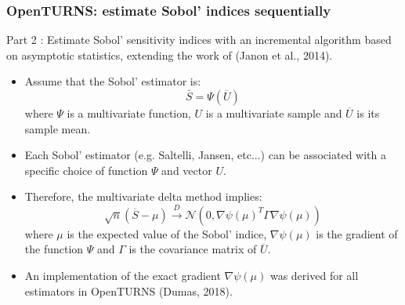 \documentclass{beamer}
\begin{document}

\begin{frame}[containsverbatim]
\frametitle{OpenTURNS: estimate Sobol' indices sequentially}

Part 2 : Estimate Sobol' sensitivity indices with an incremental algorithm 
based on asymptotic statistics, extending the work of (Janon et al., 2014).
\begin{itemize}
\item Assume that the Sobol' estimator is:
$$
\bar{S} = \Psi\left(\overline{U}\right)
$$
where $\Psi$ is a multivariate function, $U$ is a multivariate sample and $\overline{U}$ is its 
sample mean. 

\item Each Sobol' estimator (e.g. Saltelli, Jansen, etc...) 
can be associated with a specific choice of function $\Psi$ and vector $U$. 

\item Therefore, the multivariate delta method implies:
$$
\sqrt{n} \left(\overline{S} - \mu\right) \xrightarrow{D} \mathcal{N}\left(0,\nabla \psi(\mu)^T \Gamma\nabla \psi(\mu)\right)
$$
where $\mu$ is the expected value of the Sobol' indice, $\nabla \psi(\mu)$ is the 
gradient of the function $\Psi$ and $\Gamma$ is the covariance matrix of 
$\overline{U}$. 

\item An implementation of the exact gradient $\nabla \psi(\mu)$ was 
derived for all estimators in OpenTURNS (Dumas, 2018).  

\end{itemize}

\end{frame}
\end{document}
